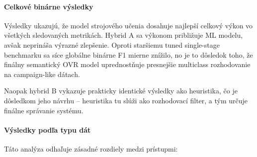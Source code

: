 \documentclass[conference]{IEEEtran}
\begin{document}
\paragraph{Celkové binárne výsledky}

\begin{table}[H]
\centering
\caption{Globálne porovnanie metód na jednotnom benchmarke}
\label{tab:global_comparison}
\footnotesize
\setlength{\tabcolsep}{4pt}
\renewcommand{\arraystretch}{1.1}
\end{table}
Výsledky ukazujú, že model strojového učenia dosahuje najlepší celkový výkon
vo všetkých sledovaných metrikách. Hybrid A sa výkonom približuje ML modelu,
avšak neprináša výrazné zlepšenie. Oproti staršiemu tuned single-stage benchmarku
sa síce globálne binárne F1 mierne znížilo, no je to dôsledok toho, že finálny
semantický OVR model uprednostňuje presnejšie multiclass rozhodovanie na campaign-like dátach.

Naopak hybrid B vykazuje prakticky identické výsledky ako heuristika,
čo je dôsledkom jeho návrhu – heuristika tu slúži ako rozhodovací filter,
a tým určuje finálne správanie systému.

\paragraph{Výsledky podľa typu dát}

\begin{table}[H]
\centering
\caption{Výkon metód podľa typu dát (F1 skóre)}
\label{tab:method_performance}
\footnotesize
\setlength{\tabcolsep}{4pt}
\renewcommand{\arraystretch}{1.1}

\end{table}
Táto analýza odhaľuje zásadné rozdiely medzi prístupmi:
\end{document}
